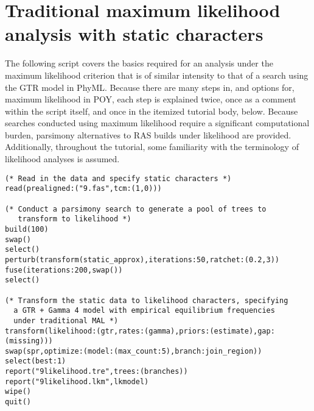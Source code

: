 \section{Traditional maximum likelihood analysis with static characters}{\label{tutorial10}}
The following script covers the basics required for an analysis under the maximum likelihood criterion that is of 
similar intensity to that of a search using the GTR model in PhyML. Because there are many steps in, and 
options for, maximum likelihood in POY, each step is explained twice, once as a comment within the script itself, 
and once in the itemized tutorial body, below. Because searches conducted using maximum likelihood require a 
significant computational burden, parsimony alternatives to RAS builds under likelihood are provided. Additionally, 
throughout the tutorial, some familiarity with the terminology of likelihood analyses is assumed.

\begin{verbatim}
(* Read in the data and specify static characters *)
read(prealigned:("9.fas",tcm:(1,0)))

(* Conduct a parsimony search to generate a pool of trees to 
   transform to likelihood *)
build(100)
swap()
select()
perturb(transform(static_approx),iterations:50,ratchet:(0.2,3))
fuse(iterations:200,swap())
select()

(* Transform the static data to likelihood characters, specifying
  a GTR + Gamma 4 model with empirical equilibrium frequencies
  under traditional MAL *)
transform(likelihood:(gtr,rates:(gamma),priors:(estimate),gap:(missing)))
swap(spr,optimize:(model:(max_count:5),branch:join_region))
select(best:1)
report("9likelihood.tre",trees:(branches))
report("9likelihood.lkm",lkmodel)
wipe()
quit()
\end{verbatim}

